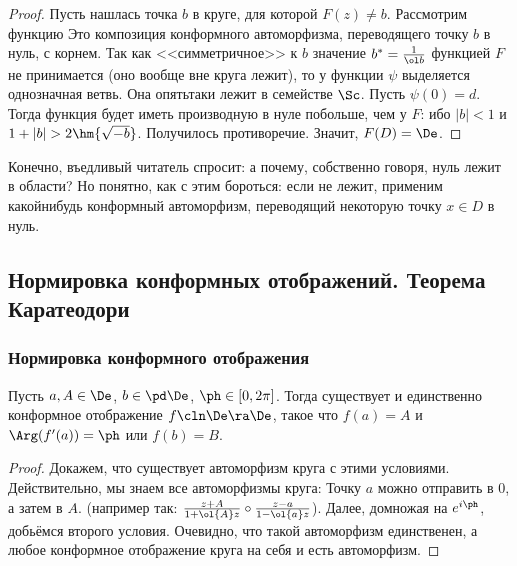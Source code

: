 \documentclass[a4paper]{article}
\begin{document}
\begin{proof}
Пусть нашлась точка $b$ в круге, для которой $F(z)\neq b$. Рассмотрим функцию
Это композиция конформного автоморфизма, переводящего точку $b$ в нуль, с корнем. Так как <<симметричное>> к $b$
значение $b^* = \frac{1}{\ol b}$ функцией $F$ не принимается (оно вообще вне круга лежит), то у функции $\psi$
выделяется однозначная ветвь. Она опять\д таки лежит в семействе $\Sc$. Пусть $\psi(0) = d$. Тогда
функция
будет иметь производную в нуле побольше, чем у $F$:
ибо $|b|<1$ и $1+|b|>2\hm{\sqrt{-b}}$. Получилось противоречие. Значит, $F(D) = \De$.
\end{proof}

\begin{note}
Конечно, въедливый читатель спросит: а почему, собственно говоря, нуль лежит в области? Но понятно, как с этим
бороться: если не лежит, применим какой\д нибудь конформный автоморфизм, переводящий некоторую точку $x\in D$ в нуль.
\end{note}

\subsection{Нормировка конформных отображений. Теорема Каратеодори}

\subsubsection{Нормировка конформного отображения}

\begin{lemma}
Пусть $a,A\in\De$, $b\in\pd\De$, $\ph\in[0,2\pi]$.
Тогда существует и единственно конформное отображение $f\cln\De\ra\De$, такое что $f(a) = A$ и  $\Arg(f'(a))=\ph$ или $f(b)=B$.
\end{lemma}
\begin{proof}
Докажем, что существует автоморфизм круга с этими условиями. Действительно, мы знаем все автоморфизмы круга:
Точку $a$ можно отправить в $0$, а затем в $A$. (например так: $\frac{z+A}{1+\ol{A}z}\circ\frac{z-a}{1-\ol{a}z}$).
Далее, домножая на $e^{i\ph}$, добьёмся второго условия. Очевидно, что такой автоморфизм единственен, а любое
конформное отображение круга на себя и есть автоморфизм.
\end{proof}
\end{document}
